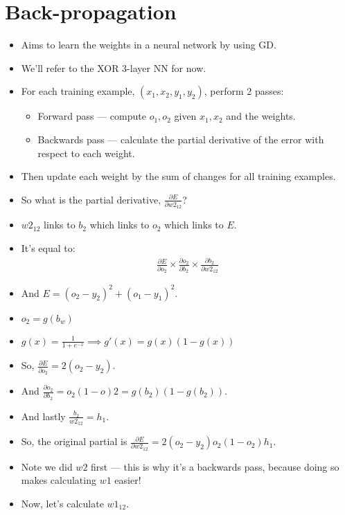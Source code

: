 \documentclass{article}
\begin{document}
\section{Back-propagation}
\begin{itemize}
    \item Aims to learn the weights in a neural network by using GD.
    \item We'll refer to the XOR 3-layer NN for now.
    \item For each training example, $(x_1, x_2, y_1, y_2)$, perform 2 passes:
        \begin{itemize}
            \item Forward pass --- compute $o_1, o_2$ given $x_1, x_2$ and the weights.
            \item Backwards pass --- calculate the partial derivative of the error with respect to each weight.
        \end{itemize}
    \item Then update each weight by the sum of changes for all training examples.
    \item So what is the partial derivative, $\frac{\partial E}{\partial w2_{12}}$?
    \item $w2_{12}$ links to $b_2$ which links to $o_2$ which links to $E$.
    \item It's equal to:
        \begin{align*}
            \frac{\partial E}{\partial o_2} \times \frac{\partial o_2}{\partial b_2} \times \frac{\partial b_2}{\partial w2_{12}}
        \end{align*}
    \item And $E = (o_2 - y_2)^2 + (o_1 - y_1)^2$.
    \item $o_2 = g(b_w)$
    \item $g(x) = \frac{1}{1 + e^{-x}} \implies g'(x) = g(x)(1-g(x))$
    \item So, $\frac{\partial E}{\partial o_2} = 2(o_2 - y_2)$.
    \item And $\frac{\partial o_2}{\partial b_2} = o_2(1 - o)2 = g(b_2)(1 - g(b_2))$.
    \item And lastly $\frac{b_2}{w2_{12}} = h_1$.
    \item So, the original partial is $\frac{\partial E}{\partial w2_{12}} = 2(o_2 - y_2) o_2 (1 - o_2)h_1$.
    \item Note we did $w2$ first --- this is why it's a backwards pass, because doing so makes calculating $w1$ easier!
    \item Now, let's calculate $w1_{12}$.

\end{itemize}
\end{document}
